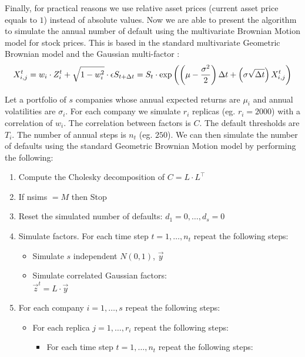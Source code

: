 \documentclass[11pt,fleqn]{book} %
\begin{document}
Finally, for practical reasons we use relative asset prices (current asset price 
equals to $1$) instead of absolute values. Now we are able to present the algorithm
to simulate the annual number of default using the multivariate Brownian Motion 
model for stock prices. This is based in the standard multivariate Geometric 
Brownian model and the Gaussian multi-factor :
\ERRORHERE
\begin{displaymath}
	X_{i,j}^t = w_i \cdot Z_i^t + \sqrt{1-w_i^2} \cdot \epsilon
	\\
	S_{t+\Delta t} = S_t \cdot \exp\left(
	\left(\mu - \frac{\sigma^2}{2}\right) \Delta t +
	\left(\sigma \sqrt{\Delta t}\right) X_{i,j}^t
	\right)
\end{displaymath}

\begin{algorithm}
	\label{alg:sdumm}
	Let a portfolio of $s$ companies whose annual expected returns are $\mu_i$ and 
	annual volatilities are $\sigma_i$. For each company we simulate $r_i$ replicas 
	(eg. $r_i=2000$) with a correlation of $w_i$. The correlation between factors 
	is $C$. The default thresholds are $T_i$. The number of annual steps is $n_t$ 
	(eg. $250$).
	We can then simulate the number of defaults using the standard Geometric Brownian
	Motion model by performing the following:
	\begin{enumerate}
		\item Compute the Cholesky decomposition of $C = L \cdot L^\intercal$
		\item If nsims $= M$ then Stop
		\item Reset the simulated number of defaults: $d_1=0,\dots,d_s=0$
		\item Simulate factors. For each time step $t=1,\dots,n_t$ repeat the following steps:
		\begin{itemize}
			\item Simulate $s$ independent $N(0,1)$, $\vec{y}$
			\item Simulate correlated Gaussian factors: \\
			$\vec{z}^t = L \cdot \vec{y}$
		\end{itemize}
		\item For each company $i=1,\dots,s$ repeat the following steps:
		\begin{itemize}
			\item For each replica $j=1,\dots,r_i$ repeat the following steps:
			\begin{itemize}
				\item For each time step $t=1,\dots,n_t$ repeat the following steps:

\end{itemize}
\end{itemize}
\end{enumerate}
\end{algorithm}
\end{document}
